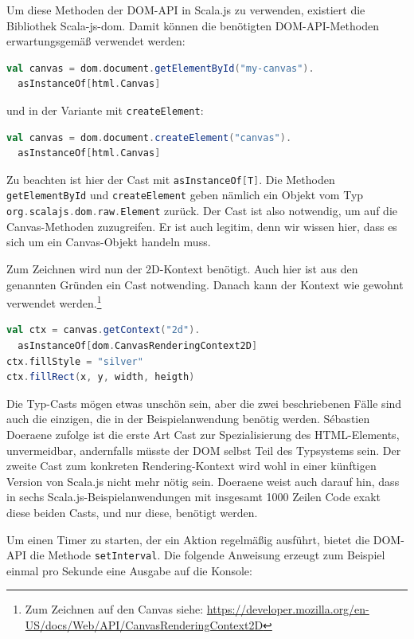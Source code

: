\documentclass[a4paper, 12pt, hidelinks, listof=totoc, listoftables=totoc, bibliography=totoc]{scrreprt}
\newcommand{\scala}[1]{\lstinline[language=Scala, style=inline]|#1|}
\begin{document}
Um diese Methoden der DOM-API in Scala.js zu verwenden, existiert die Bibliothek Scala-js-dom. Damit können die benötigten DOM-API-Methoden erwartungsgemäß verwendet werden:

\begin{lstlisting}[language=Scala, style=snippet]
val canvas = dom.document.getElementById("my-canvas").
  asInstanceOf[html.Canvas]
\end{lstlisting}

und in der Variante mit \scala{createElement}:

\begin{lstlisting}[language=Scala, style=snippet]
val canvas = dom.document.createElement("canvas").
  asInstanceOf[html.Canvas]
\end{lstlisting}

Zu beachten ist hier der Cast mit \scala{asInstanceOf[T]}. Die Methoden \scala{getElementById} und \scala{createElement}
geben nämlich ein Objekt vom Typ \scala{org.scalajs.dom.raw.Element} zurück. Der Cast ist also notwendig, um auf die Canvas-Methoden zuzugreifen. Er ist auch legitim, denn wir wissen hier, dass es sich um ein Canvas-Objekt handeln muss.

Zum Zeichnen wird nun der 2D-Kontext benötigt. Auch hier ist aus den genannten Gründen ein Cast notwending. Danach kann der Kontext wie gewohnt verwendet werden.\footnote{Zum Zeichnen auf den Canvas siehe: \url{https://developer.mozilla.org/en-US/docs/Web/API/CanvasRenderingContext2D}}

\begin{lstlisting}[language=Scala, style=snippet]
val ctx = canvas.getContext("2d").
  asInstanceOf[dom.CanvasRenderingContext2D]
ctx.fillStyle = "silver"
ctx.fillRect(x, y, width, heigth)
\end{lstlisting}

Die Typ-Casts mögen etwas unschön sein, aber die zwei beschriebenen Fälle sind auch die einzigen, die in der Beispielanwendung benötig werden. Sébastien Doeraene zufolge ist die erste Art Cast zur Spezialisierung des HTML-Elements, unvermeidbar, andernfalls müsste der DOM selbst Teil des Typsystems sein. Der zweite Cast zum konkreten Rendering-Kontext wird wohl in einer künftigen Version von Scala.js nicht mehr nötig sein. Doeraene weist auch darauf hin, dass in sechs Scala.js-Beispielanwendungen mit insgesamt 1000 Zeilen Code exakt diese beiden Casts, und nur diese, benötigt werden.\cite[S. 8]{doeraene2013.TDI}

Um einen Timer zu starten, der ein Aktion regelmäßig ausführt, bietet die DOM-API die Methode \scala{setInterval}. Die folgende Anweisung erzeugt zum Beispiel einmal pro Sekunde eine Ausgabe auf die Konsole:
\end{document}
